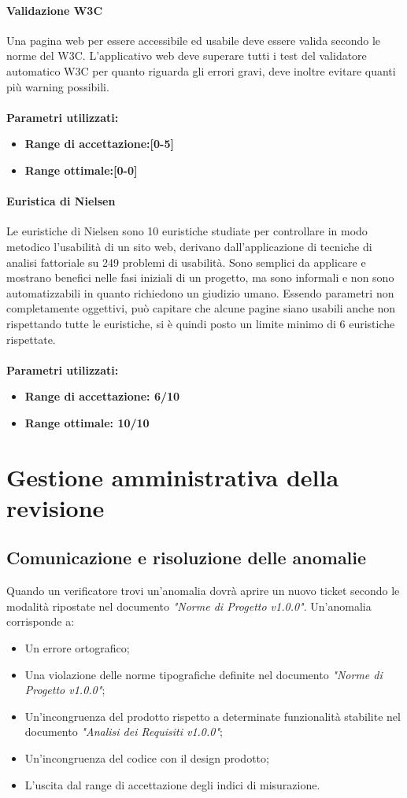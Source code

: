\documentclass[12pt,a4paper,titlepage]{article}
\begin{document}
			\paragraph{Validazione W3C}
			Una pagina web per essere accessibile ed usabile deve essere valida secondo le norme del W3C. L'applicativo web deve superare tutti i test del validatore automatico W3C per quanto riguarda gli errori gravi, deve inoltre evitare quanti più warning possibili.
			\\ \\
			\textbf{Parametri utilizzati:}
			\begin{itemize}
				\item \textbf{Range di accettazione:[0-5]}
				\item \textbf{Range ottimale:[0-0]}
			\end{itemize}
			\paragraph{Euristica di Nielsen}
			Le euristiche di Nielsen sono 10 euristiche studiate per controllare in modo metodico l'usabilità di un sito web, derivano dall'applicazione di tecniche di analisi fattoriale su 249 problemi di usabilità. Sono semplici da applicare e mostrano benefici nelle fasi iniziali di un progetto, ma sono informali e non sono automatizzabili in quanto richiedono un giudizio umano. Essendo parametri non completamente oggettivi, può capitare che alcune pagine siano usabili anche non rispettando tutte le euristiche, si è quindi posto un limite minimo di 6 euristiche rispettate.
			\\ \\
			\textbf{Parametri utilizzati:}
			\begin{itemize}
				\item \textbf{Range di accettazione: 6/10}
				\item \textbf{Range ottimale: 10/10}
			\end{itemize}
	\section{Gestione amministrativa della revisione}
		\subsection{Comunicazione e risoluzione delle anomalie}
		Quando un verificatore trovi un'anomalia dovrà aprire un nuovo ticket secondo le modalità ripostate nel documento \textit{"Norme di Progetto v1.0.0"}. Un'anomalia corrisponde a:
		\begin{itemize}
			\item Un errore ortografico;
			\item Una violazione delle norme tipografiche definite nel documento \textit{"Norme di Progetto v1.0.0"}; 
			\item Un'incongruenza del prodotto rispetto a determinate funzionalità stabilite nel documento \textit{"Analisi dei Requisiti v1.0.0"};
			\item Un'incongruenza del codice con il design prodotto;
			\item L'uscita dal range di accettazione degli indici di misurazione.
		\end{itemize}
\end{document}
